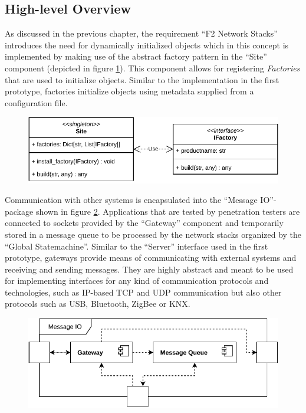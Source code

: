 \subsection{High-level Overview}
As discussed in the previous chapter, the requirement \enquote{F2 Network Stacks} introduces the need for dynamically initialized objects which in this concept is implemented by making use of the abstract factory pattern in the \enquote{Site} component (depicted in figure \ref{fig:site-factory}). This component allows for registering \emph{Factories} that are used to initialize objects. Similar to the implementation in the first prototype, factories initialize objects using metadata supplied from a configuration file.\\
\begin{figure}[H]
    \centering
    \includegraphics[width=12cm]{img/ch05/site-factory.pdf}
    \label{fig:site-factory}
\end{figure}
Communication with other systems is encapsulated into the \enquote{Message IO}-package shown in figure \ref{fig:component-view-2}. Applications that are tested by penetration testers are connected to sockets provided by the \enquote{Gateway} component and temporarily stored in a message queue to be processed by the network stacks organized by the \enquote{Global Statemachine}. Similar to the \enquote{Server} interface used in the first prototype, gateways provide means of communicating with external systems and receiving and sending messages. They are highly abstract and meant to be used for implementing interfaces for any kind of communication protocols and technologies, such as \ac{IP}-based \ac{TCP} and \ac{UDP} communication but also other protocols such as USB, Bluetooth, ZigBee or KNX.
\begin{figure}[h]
    \centering
    \includegraphics[width=12cm]{img/ch05/component-view-2-messageio.pdf}
    \label{fig:component-view-2}
\end{figure}
